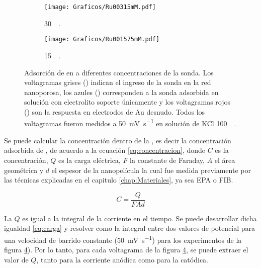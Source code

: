 \begin{figure}[th]
\begin{subfigure}[t]{0.325\textwidth}
			         	\label{fig:Ru0063mM}
			     		\end{subfigure}
		     		\begin{subfigure}[t]{0.325\textwidth}
			        	\texttt{[image: Graficos/Ru00315mM.pdf]}
			       		\vspace*{-0.40cm}\caption{\aminorutenio\space \SI{30}{\micro\Molar}.}
			         	\label{fig:Ru00315mM}
			     		\end{subfigure}
		     		\begin{subfigure}[t]{0.325\textwidth}
			        	\texttt{[image: Graficos/Ru001575mM.pdf]}
			       		\vspace*{-0.40cm}\caption{\aminorutenio\space \SI{15}{\micro\Molar}.}
			         	\label{fig:Ru001575mM}
			     		\end{subfigure}	
		 	   	   	\caption[Preconcentración de \aminorutenio]{Adsorción de \ru\space en \pdm\space a diferentes concentraciones de la sonda. Los voltagramas grises (\usebox{\gris}) indican el ingreso de la sonda en la red nanoporosa, los azules (\usebox{\azul}) corresponden a la sonda adsorbida en solución con electrolito soporte únicamente y los voltagramas rojos (\usebox{\rojo}) son la respuesta en electrodos de Au desnudo. Todos los voltagramas fueron medidos a \SI{50}{\milli\volt\per\second} en solución de KCl \SI{100}{\milli\Molar}.}
		     		\label{fig:preconcentraciones}
		     	   	\end{figure} 	

		Se puede calcular la concentración dentro de la \pdm, es decir la concentración adsorbida de \ru\space, de acuerdo a la ecuación \ref{eq:concentracion}, donde $C$ es la concentración, $Q$ es la carga eléctrica, $F$ la constante de Faraday, $A$ el área geométrica y $d$ el espesor de la nanopelícula la cual fue medida previamente por las técnicas explicadas en el capitulo \ref{chap:Materiales}, ya sea EPA o FIB.

			\begin{equation}
					C=\frac{Q}{FAd}
					\label{eq:concentracion}
			\end{equation}

		La $Q$ es igual a la integral de la corriente en el tiempo. Se puede desarrollar dicha igualdad \ref{eq:carga} y resolver como la integral entre dos valores de potencial para una velocidad de barrido constante (\SI{50}{\milli\volt\per\second}) para los experimentos de la figura \ref{fig:preconcentraciones}). Por lo tanto, para cada voltagrama de la figura \ref{fig:preconcentraciones}, se puede extraer el valor de $Q$, tanto para la corriente anódica como para la catódica.
		
